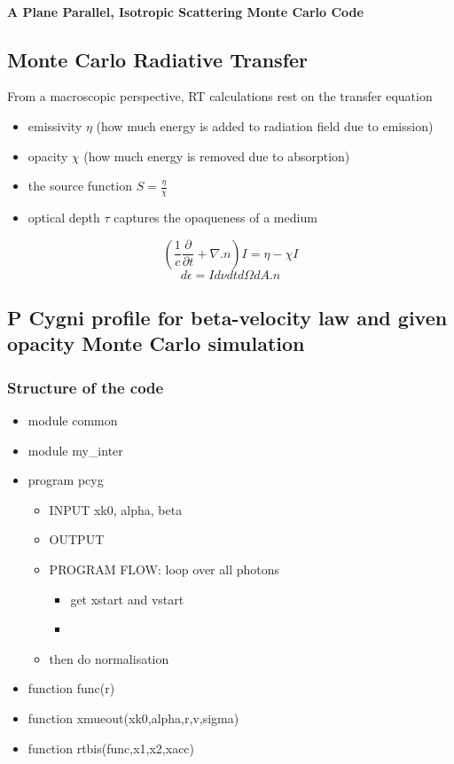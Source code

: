 \documentclass[../main/main.tex]{subfiles}
\begin{document}
\paragraph{A Plane Parallel, Isotropic Scattering Monte Carlo Code}

\newpage
\subsection{Monte Carlo Radiative Transfer}
From a macroscopic perspective, RT calculations rest on the transfer equation
\begin{itemize}
\item emissivity $\eta$ (how much energy is added to radiation field due to emission)
\item opacity $\chi$ (how much energy is removed due to absorption)
\item the source function $S = \frac{\eta}{\chi}$
\item optical depth $\tau$ captures the opaqueness of a medium
\end{itemize}
\begin{equation}
\left( \frac{1}{c} \frac{\partial}{\partial t} + \nabla.n \right)I = \eta - \chi I
\end{equation}
\begin{equation}
d\epsilon = I d \nu dt d\Omega dA.n
\end{equation}

\newpage
\subsection{P Cygni profile for beta-velocity law and given opacity Monte Carlo simulation}
\subsubsection{Structure of the code}
\begin{itemize}
\item module common

\item module my\_inter

\item program pcyg
\begin{itemize}
\item INPUT xk0, alpha, beta
\item OUTPUT 
\item PROGRAM FLOW: loop over all photons
\begin{itemize}
\item get xstart and vstart
\item 
\end{itemize}
\item then do normalisation
\end{itemize}

\item function func(r)

\item function xmueout(xk0,alpha,r,v,sigma)

\item function rtbis(func,x1,x2,xacc)
\end{itemize}
\end{document}

